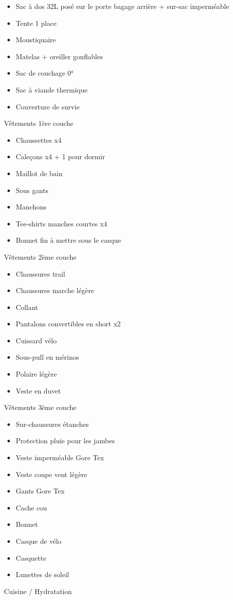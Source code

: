  \begin{itemize}
 \item Sac à dos 32L posé sur le porte bagage arrière + sur-sac imperméable
 \item Tente 1 place
 \item Moustiquaire
 \item Matelas + oreiller gonflables
 \item Sac de couchage 0°
 \item Sac à viande thermique
 \item Couverture de survie
 \end{itemize}
 Vêtements 1ère couche

 \begin{itemize}
 \item Chaussettes x4
 \item Caleçons x4 + 1 pour dormir
 \item Maillot de bain
 \item Sous gants
 \item Manchons
 \item Tee-shirts manches courtes x4
 \item Bonnet fin à mettre sous le casque
 \end{itemize}
 Vêtements 2ème couche

 \begin{itemize}
 \item Chaussures trail
 \item Chaussures marche légère
 \item Collant
 \item Pantalons convertibles en short x2
 \item Cuissard vélo
 \item Sous-pull en mérinos
 \item Polaire légère
 \item Veste en duvet
 \end{itemize}
 Vêtements 3ème couche

 \begin{itemize}
 \item Sur-chaussures étanches
 \item Protection pluie pour les jambes
 \item Veste imperméable Gore Tex
 \item Veste coupe vent légère
 \item Gants Gore Tex
 \item Cache cou
 \item Bonnet
 \item Casque de vélo
 \item Casquette
 \item Lunettes de soleil
 \end{itemize}
 Cuisine / Hydratation


